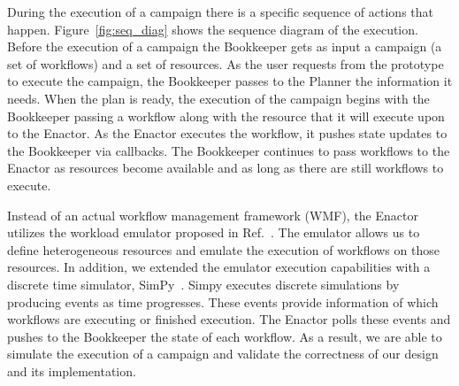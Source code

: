 During the execution of a campaign there is a specific sequence of actions that happen.
Figure~\ref{fig:seq_diag} shows the sequence diagram of the execution.
Before the execution of a campaign the Bookkeeper gets as input a campaign (a set of workflows) and a set of resources.
As the user requests from the prototype to execute the campaign, the Bookkeeper passes to the Planner the information it needs.
When the plan is ready, the execution of the campaign begins with the Bookkeeper passing a workflow along with the resource that it will execute upon to the Enactor.
As the Enactor executes the workflow, it pushes state updates to the Bookkeeper via callbacks.
The Bookkeeper continues to pass workflows to the Enactor as resources become available and as long as there are still workflows to execute.

Instead of an actual workflow management framework (WMF), the Enactor utilizes the workload emulator proposed in Ref.~\cite{balasubramanian2019programming}.
The emulator allows us to define heterogeneous resources and emulate the execution of workflows on those resources.
In addition, we extended the emulator execution capabilities with a discrete time simulator, SimPy~\cite{simpy}.
Simpy executes discrete simulations by producing events as time progresses.
These events provide information of which workflows are executing or finished execution.
The Enactor polls these events and pushes to the Bookkeeper the state of each workflow.
As a result, we are able to simulate the execution of a campaign and validate the correctness of our design and its implementation.

